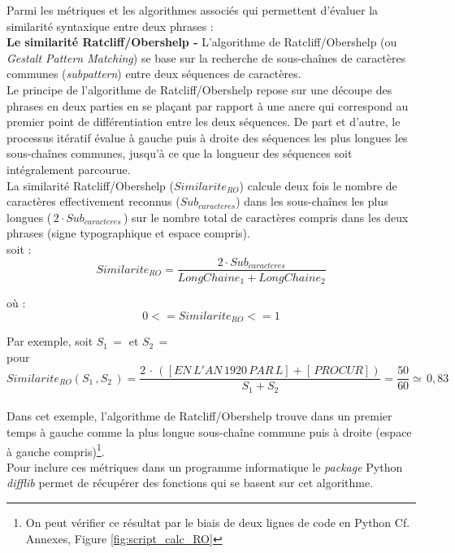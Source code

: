 Parmi les métriques et les algorithmes associés qui permettent d'évaluer la similarité syntaxique entre deux phrases :\\

\textbf{Le similarité Ratcliff/Obershelp -} L'algorithme de Ratcliff/Obershelp (ou \textit{Gestalt Pattern Matching}) se base sur la recherche de sous-chaînes de caractères communes (\textit{subpattern}) entre deux séquences de caractères.\\

Le principe de l'algorithme de Ratcliff/Obershelp repose sur une découpe des phrases en deux parties en se plaçant par rapport à une ancre qui correspond au premier point de différentiation entre les deux séquences. De part et d'autre, le processus itératif évalue à gauche puis à droite des séquences les plus longues les sous-chaînes communes, jusqu'à ce que la longueur des séquences soit intégralement parcourue.\\
\newpage
La similarité Ratcliff/Obershelp ($ Similarite_{RO} $) calcule deux fois le nombre de caractères effectivement reconnus ($Sub_{caracteres}$) dans les sous-chaînes les plus longues ($\, 2 \cdot Sub_{caracteres} \,$) sur le nombre total de caractères compris dans les deux phrases (signe typographique et espace compris).\\

soit : $$ Similarite_{RO} = \frac{2 \cdot Sub_{caracteres}}{LongChaine_1+LongChaine_2} $$

où : $$ 0 <= Similarite_{RO} <= 1 $$

Par exemple, soit $ S_1 \,= $  et $ S_2 \,=$ \\

pour $$Similarite_{RO}(S_1 \,, S_2 \,) = \frac{2 \, \cdot \, ([EN\, L'AN\, 1920\, PAR\, L] + [\, PROCUR])}{S_1+S_2} = \frac{50}{60} \simeq  \, 0,83$$\\ 

Dans cet exemple, l'algorithme de Ratcliff/Obershelp trouve dans un premier temps  à gauche comme la plus longue sous-chaîne commune puis à droite  (espace à gauche compris)\footnote{On peut vérifier ce résultat par le biais de deux lignes de code en Python Cf. Annexes, Figure \ref{fig:script_calc_RO}}.\\

Pour inclure ces métriques dans un programme informatique le \textit{package} Python \textit{difflib} permet de récupérer des fonctions qui se basent sur cet algorithme.\\

